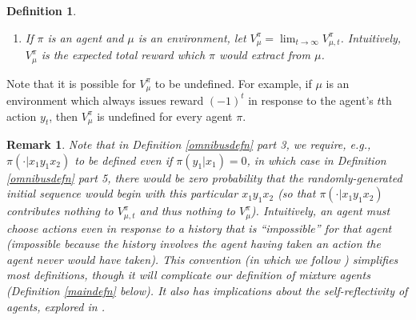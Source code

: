 \documentclass[twoside]{article}
\newtheorem{definition}[theorem]{Definition}
\newtheorem{remark}[theorem]{Remark}
\begin{document}
\begin{definition}
\begin{enumerate}
        the rewards which would occur in the sequence
        $x_1y_1\ldots x_{t+1}y_{t+1}$
        randomly generated as follows:
        \begin{enumerate}
            \item $x_1\in \mathcal P$ is chosen randomly based
            on the probability measure $\mu(\cdot|\langle\rangle)$.
            \item $y_1\in\mathcal A$ is chosen randomly based on the probability
            measure $\pi(\cdot|x_1)$.
            \item
            For each $i>1$,
            $x_i\in\mathcal P$ is chosen randomly based on
            the probability measure
            $\mu(\cdot|x_1y_1\ldots x_{i-1}y_{i-1})$.
            \item
            For each $i>1$,
            $y_i\in\mathcal A$ is chosen randomly based on the probability measure
            $\pi(\cdot|x_1y_1\ldots x_{i-1}y_{i-1}x_i)$.
        \end{enumerate}
        \item
        If $\pi$ is an agent and $\mu$ is an environment,
        let $V^\pi_\mu=\lim_{t\to\infty}V^{\pi}_{\mu,t}$.
        Intuitively, $V^\pi_\mu$ is the expected total reward which $\pi$ would extract
        from $\mu$.
    \end{enumerate}
\end{definition}

Note that it is possible for $V^\pi_\mu$ to be undefined.
For example, if $\mu$ is an environment which always issues
reward $(-1)^t$ in response to the agent's $t$th action $y_t$,
then $V^\pi_\mu$ is undefined for every agent $\pi$.

\begin{remark}
\label{impossibleremark}
    Note that in Definition \ref{omnibusdefn} part 3, we require,
    e.g., $\pi(\cdot|x_1y_1x_2)$ to be defined even if
    $\pi(y_1|x_1)=0$, in which case in Definition \ref{omnibusdefn} part 5,
    there would be zero probability that the randomly-generated initial
    sequence would begin with this particular $x_1y_1x_2$
    (so that $\pi(\cdot|x_1y_1x_2)$ contributes nothing to
    $V^\pi_{\mu,t}$ and thus nothing to $V^\pi_\mu$).
    Intuitively, an agent must choose actions even in response to
    a history that is ``impossible'' for that agent (impossible because the history
    involves the agent having taken an action the agent never would have taken).
    This convention (in which we follow \cite{legg2007universal}) simplifies most
    definitions, though it will complicate our definition of mixture agents
    (Definition \ref{maindefn} below). It also has implications about the
    self-reflectivity of agents, explored in \cite{extendedenvironmentspaper}.
\end{remark}
\end{document}
